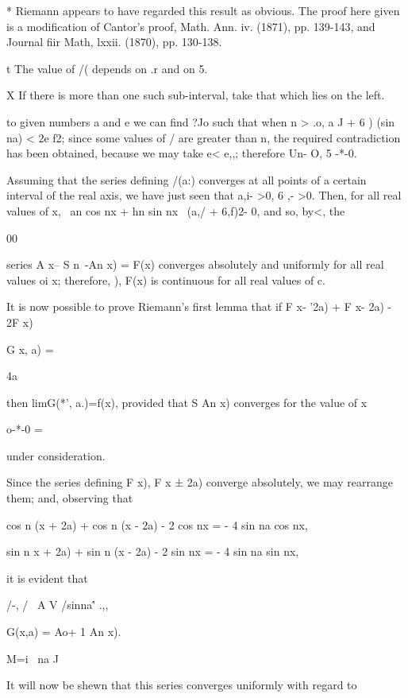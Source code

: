 * Riemann appears to have regarded this result as obvious. The proof
here given is a modification of Cantor's proof, Math. Ann. iv. (1871),
pp. 139-143, and Journal fiir Math, lxxii. (1870), pp. 130-138.

t The value of /( depends on .r and on 5.

X If there is more than one such sub-interval, take that which lies on
the left.

%
%

to given numbers a and e we can find ?Jo such that when n > .o, a J +
6 ) (sin na) < 2e f2; since some values of / are greater than n, the
required contradiction has been obtained, because we may take e< e,,;
therefore Un- O, 5 -*-0.

Assuming that the series defining /(a:) converges at all points of a
certain interval of the real axis, we have just seen that a,i- >0, 6
,- >0. Then, for all real values of x, \ an cos nx + hn sin nx \ (a,/
+ 6,f)2- 0, and so, by<, the

00

series A x-- S n~-An x) = F(x) converges absolutely and uniformly for
all real values oi x; therefore, ), F(x) is continuous for all
real values of c.


It is now possible to prove Riemann's first lemma that if F x- '2a) +
F x- 2a) - 2F x)

G x, a) =

4a

then limG(*', a.)=f(x), provided that S An x) converges for the value
of x

o-*-0 =

under consideration.

Since the series defining F x), F x ± 2a) converge absolutely, we may
rearrange them; and, observing that

cos n (x + 2a) + cos n (x - 2a) - 2 cos nx = - 4 sin na cos nx,

sin n x + 2a) + sin n (x - 2a) - 2 sin nx = - 4 sin na sin nx,

it is evident that

/-, / \ A V /sinna\'' .,,

G(x,a) = Ao+ 1 An x).

M=i \ na J

It will now be shewn that this series converges uniformly with regard
to

